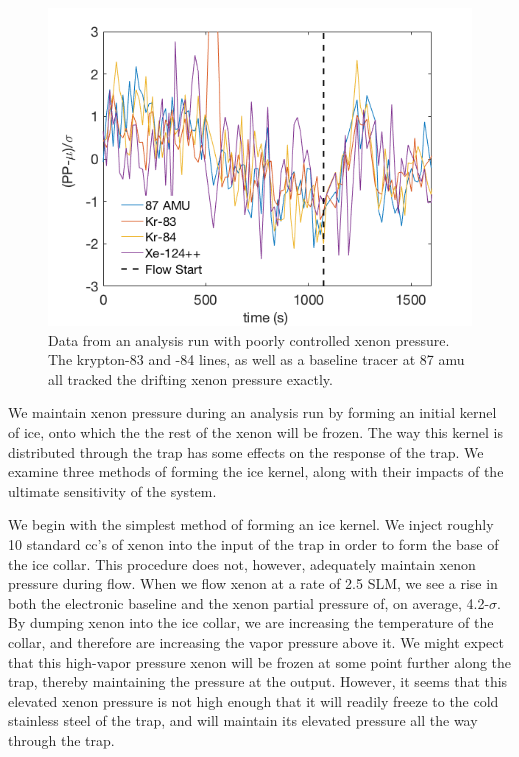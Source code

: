 \begin{figure}[h!]
\centering
\includegraphics[width=\textwidth]{Figures/RGA_noise_correlation.png}
\caption{Data from an analysis run with poorly controlled xenon pressure. The krypton-83 and -84 lines, as well as a baseline tracer at 87 amu all tracked the drifting xenon pressure exactly. } 
\label{fig:correlatednoise}
\end{figure} 

We maintain xenon pressure during an analysis run by forming an initial kernel of ice, onto which the the rest of the xenon will be frozen. The way this kernel is distributed through the trap has some effects on the response of the trap. We examine three methods of forming the ice kernel, along with their impacts of the ultimate sensitivity of the system. 

We begin with the simplest method of forming an ice kernel. We inject roughly 10 standard cc's of xenon into the input of the trap in order to form the base of the ice collar. This procedure does not, however, adequately maintain xenon pressure during flow. When we flow xenon at a rate of 2.5 SLM, we see a rise in both the electronic baseline and the xenon partial pressure of, on average, 4.2-$\sigma$. By dumping xenon into the ice collar, we are increasing the temperature of the collar, and therefore are increasing the vapor pressure above it. We might expect that this high-vapor pressure xenon will be frozen at some point further along the trap, thereby maintaining the pressure at the output. However, it seems that this elevated xenon pressure is not high enough that it will readily freeze to the cold stainless steel of the trap, and will maintain its elevated pressure all the way through the trap.

